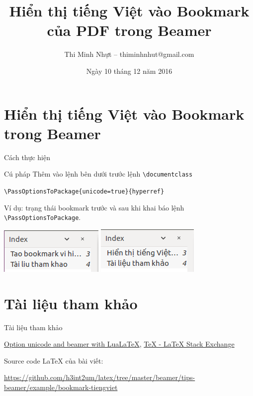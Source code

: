 \documentclass[17pt]{beamer}
\author[Thi Minh Nhựt]{Thi Minh Nhựt -- thiminhnhut@gmail.com}
\title[Tiếng Việt trong Bookmark]{Hiển thị tiếng Việt vào Bookmark của PDF trong Beamer}
\date[Cần Thơ, 2016]{Ngày 10 tháng 12 năm 2016}
\begin{document}
\begin{frame}
\titlepage
\end{frame}


\section{Hiển thị tiếng Việt vào Bookmark trong Beamer}
\begin{frame}[fragile]{Cách thực hiện}
	\begin{block}{Cú pháp}
		Thêm vào lệnh bên dưới trước lệnh \verb+\documentclass+
		
		\verb+\PassOptionsToPackage{unicode=true}{hyperref}+
	\end{block}
	
	Ví dụ: trạng thái bookmark trước và sau khi khai báo  lệnh \verb+\PassOptionsToPackage+.
	\begin{center}
			\includegraphics[scale=.61]{images/bookmark-khongtiengviet.png} \hspace{.2cm}
			\includegraphics[scale=.6]{images/bookmark-tiengviet.png} 
		\end{center}
\end{frame}

\section{Tài liệu tham khảo}
\begin{frame}{Tài liệu tham khảo}
	\begin{enumerate}[{[1]}]
		\justifying
		\item \href{http://tex.stackexchange.com/questions/308047/option-unicode-and-beamer-with-lualatex}{Option unicode and beamer with LuaLaTeX}, \href{http://tex.stackexchange.com/}{TeX - LaTeX Stack Exchange}
		
		\item Source code \LaTeX{} của bài viết: 
		
		\href{https://github.com/h3int2um/latex/tree/master/beamer/tips-beamer/example/bookmark-tiengviet}{\footnotesize{https://github.com/h3int2um/latex/tree/master/beamer/tips-beamer/example/bookmark-tiengviet}}
	\end{enumerate}
\end{frame}
\end{document}
